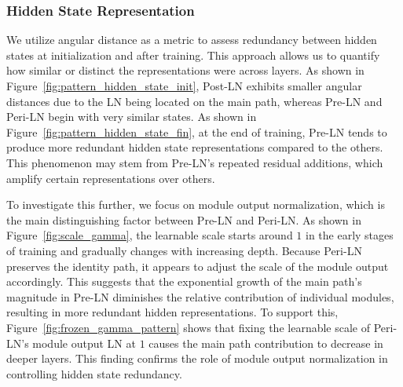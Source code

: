 \subsubsection{Hidden State Representation} \label{subsec:hidden_state_representation}
We utilize angular distance \citep{mixln} as a metric to assess redundancy between hidden states at initialization and after training. This approach allows us to quantify how similar or distinct the representations were across layers. As shown in Figure~\ref{fig:pattern_hidden_state_init}, Post-LN exhibits smaller angular distances due to the LN being located on the main path, whereas Pre-LN and Peri-LN begin with very similar states. As shown in Figure~\ref{fig:pattern_hidden_state_fin}, at the end of training, Pre-LN tends to produce more redundant hidden state representations compared to the others. This phenomenon may stem from Pre-LN’s repeated residual additions, which amplify certain representations over others.

To investigate this further, we focus on module output normalization, which is the main distinguishing factor between Pre-LN and Peri-LN. As shown in Figure~\ref{fig:scale_gamma}, the learnable scale starts around $1$ in the early stages of training and gradually changes with increasing depth. Because Peri-LN preserves the identity path, it appears to adjust the scale of the module output accordingly. This suggests that the exponential growth of the main path’s magnitude in Pre-LN diminishes the relative contribution of individual modules, resulting in more redundant hidden representations. To support this, Figure~\ref{fig:frozen_gamma_pattern} shows that fixing the learnable scale of Peri-LN’s module output LN at $1$ causes the main path contribution to decrease in deeper layers. This finding confirms the role of module output normalization in controlling hidden state redundancy.
